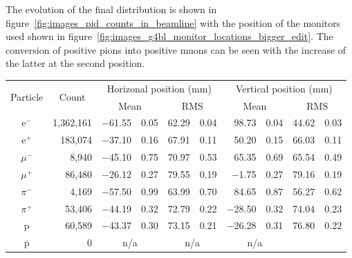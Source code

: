 The evolution of the final distribution is shown in figure~\ref{fig:images_pid_counts_in_beamline} with the position of the monitors used shown in figure~\ref{fig:images_g4bl_monitor_locations_bigger_edit}. The conversion of positive pions into positive muons can be seen with the increase of the latter at the second position.

\begin{table}[hptb]
  \begin{center}
  \begin{tabular}{c | r | r@{\(\pm\)}l | r@{\(\pm\)}l | r@{\(\pm\)}l | r@{\(\pm\)}l}
    \multicolumn{1}{c|}{\multirow{2}{*}{Particle}} 
               &   \multicolumn{1}{c|}{\multirow{2}{*}{Count}} 
                             &  \multicolumn{4}{c|}{Horizonal position (mm)}
                                              &  \multicolumn{4}{c}{Vertical position (mm)}    \\
               &             &  \multicolumn{2}{c|}{Mean}  
                                                   &  \multicolumn{2}{c|}{RMS}  
                                                         &  \multicolumn{2}{c|}{Mean}  
                                                                    &  \multicolumn{2}{c|}{RMS}  \\
    \hline
      e\(^-\)  &  1,362,161  &  \(-\)61.55 & 0.05  &  62.29 & 0.04  &       98.73 & 0.04  &  44.62 & 0.03  \\
      e\(^+\)  &    183,074  &  \(-\)37.10 & 0.16  &  67.91 & 0.11  &       50.20 & 0.15  &  66.03 & 0.11  \\
    \(\mu^-\)  &      8,940  &  \(-\)45.10 & 0.75  &  70.97 & 0.53  &       65.35 & 0.69  &  65.54 & 0.49  \\
    \(\mu^+\)  &     86,480  &  \(-\)26.12 & 0.27  &  79.55 & 0.19  &   \(-\)1.75 & 0.27  &  79.16 & 0.19  \\
    \(\pi^-\)  &      4,169  &  \(-\)57.50 & 0.99  &  63.99 & 0.70  &       84.65 & 0.87  &  56.27 & 0.62  \\
    \(\pi^+\)  &     53,406  &  \(-\)44.19 & 0.32  &  72.79 & 0.22  &  \(-\)28.50 & 0.32  &  74.04 & 0.23  \\
       p       &     60,589  &  \(-\)43.37 & 0.30  &  73.15 & 0.21  &  \(-\)26.28 & 0.31  &  76.80 & 0.22  \\
    \(\overline{\text{p}}\)
               &          0  & \multicolumn{2}{c|}{n/a}  
                                                   &  \multicolumn{2}{c}{n/a}
                                                                    & \multicolumn{2}{c}{n/a}

\end{tabular}
\end{center}
\end{table}
